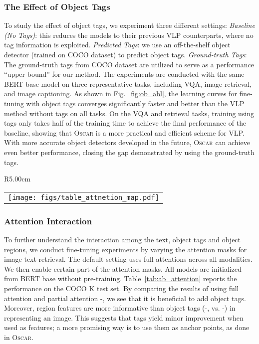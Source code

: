 \documentclass[runningheads]{llncs}
\newcommand{\short}{\textsc{Oscar}}
\def\secvspace{{\vspace{-4mm}}}
\begin{document}
\secvspace
\subsubsection{The Effect of Object Tags}
To study the effect of object tags, we experiment three different settings: 
 \textit{Baseline (No Tags)}: this reduces the models to their previous VLP counterparts, where no tag information is exploited.
 \textit{Predicted Tags}: we use an off-the-shelf object detector (trained on COCO dataset) to predict object tags.
 \textit{Ground-truth Tags}: The ground-truth tags from COCO dataset are utilized to serve as a performance ``upper bound'' for our method. The experiments are conducted with the same BERT base model on three representative tasks, including VQA, image retrieval, and image captioning. 
As shown in Fig.~\ref{fig:ob_abl}, the learning curves for fine-tuning with object tags converges significantly faster and better than the VLP method without tags on all tasks. On the VQA and retrieval tasks, training using tags only takes half of the training time to achieve the final performance of the baseline, showing that \short{} is a more practical and efficient scheme for VLP. With more accurate object detectors developed in the future, \short{} can achieve even better performance, closing the gap demonstrated by using the ground-truth tags.


\begin{wrapfigure}{R}{5.00cm}
\centering
	\vspace{-8mm}
	\begin{tabular}{c}	
	\hspace{-4mm}
		\texttt{[image: figs/table\_attnetion\_map.pdf]} \\
	\end{tabular}
	\vspace{-2mm}
	\label{tab:ab_attention}
\vspace{-6mm}
\end{wrapfigure}
\subsubsection{Attention Interaction}
To further understand the interaction among the text, object tags and object regions, we conduct fine-tuning experiments by varying the attention masks for image-text retrieval. The default setting uses full attentions across all modalities. We then enable certain part of the attention masks. All models are initialized from BERT base without pre-training. 
Table~\ref{tab:ab_attention} reports the performance on the COCO K test set. By comparing the results of using full attention and partial attention -, we see that it is beneficial to add object tags. Moreover, region features are more informative than object tags (-, vs.  -) in representing an image. This suggests that tags yield minor improvement when used as features; a more promising way is to use them as anchor points, as done in \short{}.
\end{document}
